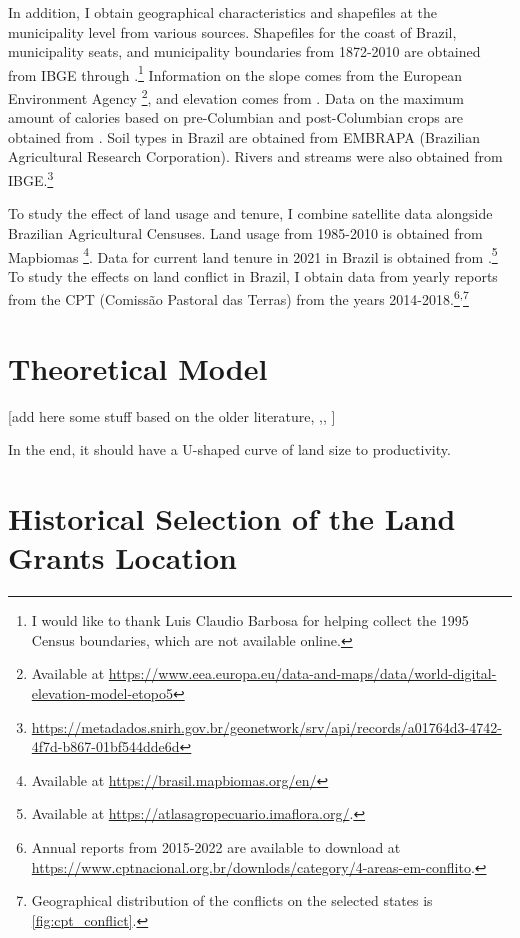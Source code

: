 \documentclass[11pt]{article}
\begin{document}
In addition, I obtain geographical characteristics and shapefiles at the municipality level from various sources. 
Shapefiles for the coast of Brazil, municipality seats, and municipality boundaries from 1872-2010 are obtained from IBGE through \textcite{Pereira2023-qq}.\footnote{I would like to thank Luis Claudio Barbosa for helping collect the 1995 Census boundaries, which are not available online.}
Information on the slope comes from the European Environment Agency
\footnote{
  Available at \url{https://www.eea.europa.eu/data-and-maps/data/world-digital-elevation-model-etopo5}}, and elevation comes from \textcite{Amatulli2018-gl}.
Data on the maximum amount of calories based on pre-Columbian and post-Columbian crops are obtained from \textcite{Galor2016-ba}. 
Soil types in Brazil are obtained from EMBRAPA (Brazilian Agricultural Research Corporation).
Rivers and streams were also obtained from IBGE.\footnote{\url{https://metadados.snirh.gov.br/geonetwork/srv/api/records/a01764d3-4742-4f7d-b867-01bf544dde6d}}

To study the effect of land usage and tenure, I combine satellite data alongside Brazilian Agricultural Censuses. 
Land usage from 1985-2010 is obtained from Mapbiomas \parencite{Souza2020-kb}\footnote{
  Available at \url{https://brasil.mapbiomas.org/en/}}.
Data for current land tenure in 2021 in Brazil is obtained from \textcite{Sparovek2019-dn}.\footnote{
  Available at \url{https://atlasagropecuario.imaflora.org/}.}
To study the effects on land conflict in Brazil, I obtain data from yearly reports from the CPT (Comissão Pastoral das Terras) from the years 2014-2018.\footnote{Annual reports from 2015-2022 are available to download at \url{https://www.cptnacional.org.br/downlods/category/4-areas-em-conflito}.}\textsuperscript{,}\footnote{Geographical distribution of the conflicts on the selected states is \autoref{fig:cpt_conflict}.}

\section{Theoretical Model}
\label{sec:theory}

[add here some stuff based on the older literature, \parencite{Carter1984-aj} ,\parencite{Benjamin1995-ca}, \parencite{Benjamin1992-tk}]

In the end, it should have a U-shaped curve of land size to productivity.

\section{Historical Selection of the Land Grants Location}
\label{sec:selection}
\end{document}
